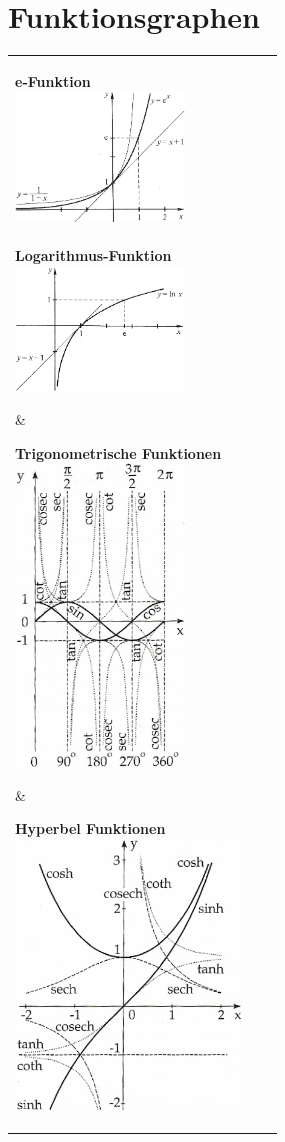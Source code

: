 \section{Funktionsgraphen}
\begin{tabular}{lll}
\parbox{5.5cm}{
  \textbf{e-Funktion} \\
  \includegraphics[width=4.5cm]{./bilder/funktionen_e.png} \\ \\
  
  \textbf{Logarithmus-Funktion}\\
  \includegraphics[width=4.5cm]{./bilder/funktionen_ln.png} 
}
& \parbox{5.5cm}{
  \textbf{Trigonometrische Funktionen}\\
  \includegraphics[width=4.5cm]{./bilder/funktionen_trigo.png} 
}
& \parbox{7cm}{
  \textbf{Hyperbel Funktionen}\\
  \includegraphics[width=6cm]{./bilder/funktionen_hyperbel.png} 
}
\end{tabular}
